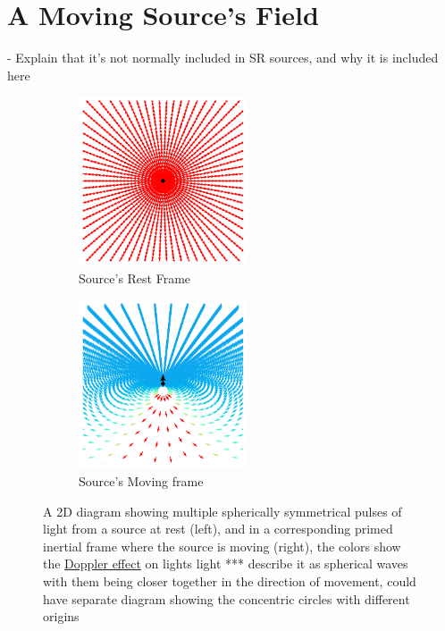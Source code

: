 \chapter{A Moving Source's Field} \label{ch: A Moving Source's Field}

- Explain that it’s not normally included in SR sources, and why it is included here

\begin{figure}[H]
	\begin{subfigure}{.49\textwidth}
		\centering
		\includegraphics[width = 5cm]{images/pdf/Field_Rest_Frame.pdf}
		\caption{Source's Rest Frame}
	\end{subfigure}
	\begin{subfigure}{.49\textwidth}
		\centering
		\includegraphics[width = 5cm]{images/pdf/Field_Moving_Frame_Doppler.pdf}
		\caption{Source's Moving frame}
	\end{subfigure}
	\caption{A 2D diagram showing multiple spherically symmetrical pulses of light from a source at rest (left), and in a corresponding primed inertial frame where the source is moving (right), the colors show the \protect\hyperlink{def-doppler-effect}{Doppler effect} on lights light *** describe it as spherical waves with them being closer together in the direction of movement, could have separate diagram showing the concentric circles with different origins}
	\label{fig: full field transformation 2}
\end{figure}

